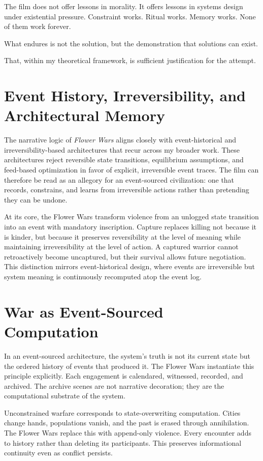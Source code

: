 \documentclass[12pt]{article}
\begin{document}
The film does not offer lessons in morality. It offers lessons in systems design under existential pressure. Constraint works. Ritual works. Memory works. None of them work forever.

What endures is not the solution, but the demonstration that solutions can exist.

That, within my theoretical framework, is sufficient justification for the attempt.

\section*{Event History, Irreversibility, and Architectural Memory}

The narrative logic of \textit{Flower Wars} aligns closely with event-historical and irreversibility-based architectures that recur across my broader work. These architectures reject reversible state transitions, equilibrium assumptions, and feed-based optimization in favor of explicit, irreversible event traces. The film can therefore be read as an allegory for an event-sourced civilization: one that records, constrains, and learns from irreversible actions rather than pretending they can be undone.

At its core, the Flower Wars transform violence from an unlogged state transition into an event with mandatory inscription. Capture replaces killing not because it is kinder, but because it preserves reversibility at the level of meaning while maintaining irreversibility at the level of action. A captured warrior cannot retroactively become uncaptured, but their survival allows future negotiation. This distinction mirrors event-historical design, where events are irreversible but system meaning is continuously recomputed atop the event log.

\section*{War as Event-Sourced Computation}

In an event-sourced architecture, the system's truth is not its current state but the ordered history of events that produced it. The Flower Wars instantiate this principle explicitly. Each engagement is calendared, witnessed, recorded, and archived. The archive scenes are not narrative decoration; they are the computational substrate of the system.

Unconstrained warfare corresponds to state-overwriting computation. Cities change hands, populations vanish, and the past is erased through annihilation. The Flower Wars replace this with append-only violence. Every encounter adds to history rather than deleting its participants. This preserves informational continuity even as conflict persists.
\end{document}
